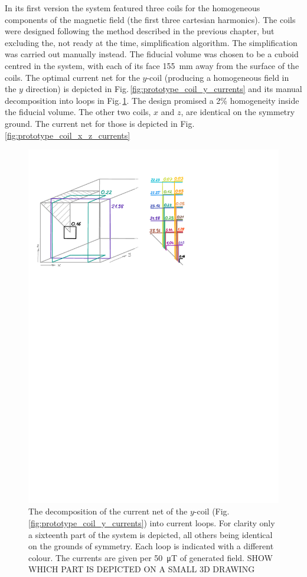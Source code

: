 In its first version the system featured three coils for the homogeneous components of the magnetic field (the first three cartesian harmonics). The coils were designed following the method described in the previous chapter, but excluding the, not ready at the time, simplification algorithm. The simplification was carried out manually instead. The fiducial volume was chosen to be a cuboid centred in the system, with each of its face \SI{155}{\milli\meter} away from the surface of the coils. The optimal current net for the $y$-coil (producing a homogeneous field in the $y$ direction) is depicted in Fig.\,\ref{fig:prototype_coil_y_currents} and its manual decomposition into loops in Fig.\,\ref{fig:prototype_coil_y_decomposition}. The design promised a 2\% homogeneity inside the fiducial volume. The other two coils, $x$ and $z$, are identical on the symmetry ground. The current net for those is depicted in Fig.\,\ref{fig:prototype_coil_x_z_currents}

\begin{figure}
  \centering
  \includegraphics[width=0.9\linewidth]{gfx/prototype/coil_y_decomposition.pdf}
  \caption{The decomposition of the current net of the $y$-coil (Fig.\,\ref{fig:prototype_coil_y_currents}) into current loops. For clarity only a sixteenth part of the system is depicted, all others being identical on the grounds of symmetry. Each loop is indicated with a different colour. The currents are given per \SI{50}{\micro\tesla} of generated field. SHOW WHICH PART IS DEPICTED ON A SMALL 3D DRAWING}\label{fig:prototype_coil_y_decomposition}
\end{figure}

